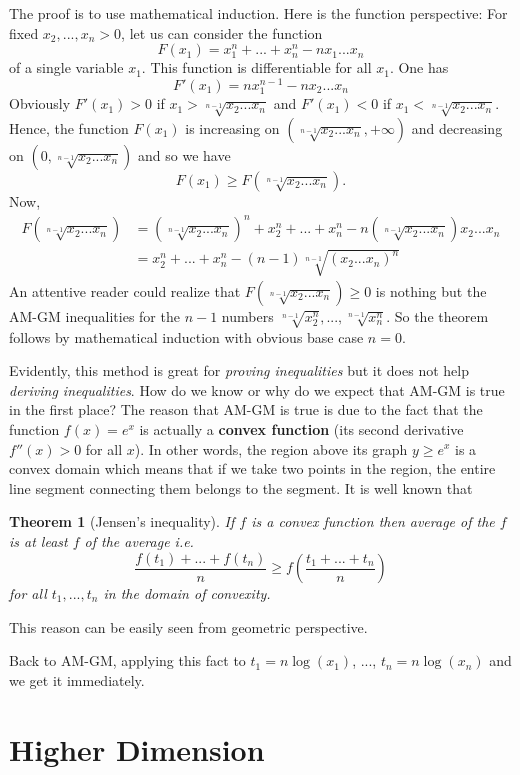 \documentclass[10pt]{amsart}
\newtheorem{thm}{Theorem}
\begin{document}
The proof is to use mathematical induction. Here is the function perspective: For fixed $x_2, ..., x_n > 0$, let us can consider the function
$$F(x_1) = x_1^n + ... + x_n^n - n x_1 ... x_n$$
of a single variable $x_1$. This function is differentiable for all $x_1$. One has
$$F'(x_1) = n x_1^{n-1} - n x_2 ... x_n$$
Obviously $F'(x_1) > 0$ if $x_1 > \sqrt[n-1]{x_2 ... x_n}$ and $F'(x_1) < 0$ if $x_1 < \sqrt[n-1]{x_2 ... x_n}$. Hence, the function $F(x_1)$ is increasing on $(\sqrt[n-1]{x_2 ... x_n}, +\infty)$ and decreasing on $(0, \sqrt[n-1]{x_2 ... x_n})$ and so we have
$$F(x_1) \geq F(\sqrt[n-1]{x_2 ... x_n}).$$
Now,
\begin{align*}
F(\sqrt[n-1]{x_2 ... x_n}) &= (\sqrt[n-1]{x_2 ... x_n})^n + x_2^n + ... + x_n^n - n (\sqrt[n-1]{x_2 ... x_n}) x_2 ... x_n\\
&= x_2^n + ... + x_n^n - (n-1) \sqrt[n-1]{(x_2 ... x_n)^n}
\end{align*}
An attentive reader could realize that $F(\sqrt[n-1]{x_2 ... x_n}) \geq 0$ is nothing but the AM-GM inequalities for the $n-1$ numbers $\sqrt[n-1]{x_2^n}, ..., \sqrt[n-1]{x_n^n}$. So the theorem follows by mathematical induction with obvious base case $n = 0$.

Evidently, this method is great for \emph{proving inequalities} but it does not help \emph{deriving inequalities}. How do we know or why do we expect that AM-GM is true in the first place? The reason that AM-GM is true is due to the fact that the function $f(x) = e^x$ is actually a \textbf{convex function} (its second derivative $f''(x) > 0$ for all $x$). In other words, the region above its graph $y \geq e^x$ is a convex domain which means that if we take two points in the region, the entire line segment connecting them belongs to the segment. It is well known that
\begin{thm}[Jensen's inequality]
If $f$ is a convex function then average of the $f$ is at least $f$ of the average i.e.
$$\frac{f(t_1) + ... + f(t_n)}{n} \geq f\left(\frac{t_1 + ... + t_n}{n}\right)$$
for all $t_1, ..., t_n$ in the domain of convexity.
\end{thm}
This reason can be easily seen from geometric perspective.

Back to AM-GM, applying this fact to $t_1 = n \log(x_1)$, ..., $t_n = n \log(x_n)$ and we get it immediately.

\section{Higher Dimension}
\end{document}
